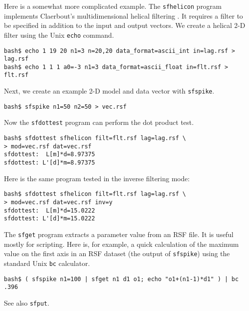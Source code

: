 Here is a somewhat more complicated example. The \texttt{sfhelicon}
program implements Claerbout's multidimensional helical filtering
\cite[]{GEO63-05-15321541}. It requires a filter to be specified in
addition to the input and output vectors. We create a helical 
2-D filter using the Unix \texttt{echo} command.
\begin{verbatim}
bash$ echo 1 19 20 n1=3 n=20,20 data_format=ascii_int in=lag.rsf > lag.rsf
bash$ echo 1 1 1 a0=-3 n1=3 data_format=ascii_float in=flt.rsf > flt.rsf
\end{verbatim}
Next, we create an example 2-D model and data vector with \texttt{sfspike}.
\begin{verbatim}
bash$ sfspike n1=50 n2=50 > vec.rsf
\end{verbatim}
Now the \texttt{sfdottest} program can perform the dot product test.
\begin{verbatim}
bash$ sfdottest sfhelicon filt=flt.rsf lag=lag.rsf \
> mod=vec.rsf dat=vec.rsf
sfdottest:  L[m]*d=8.97375
sfdottest: L'[d]*m=8.97375
\end{verbatim}
Here is the same program tested in the inverse filtering mode:
\begin{verbatim}
bash$ sfdottest sfhelicon filt=flt.rsf lag=lag.rsf \
> mod=vec.rsf dat=vec.rsf inv=y
sfdottest:  L[m]*d=15.0222
sfdottest: L'[d]*m=15.0222
\end{verbatim}

\noindent\doublebox{\parbox{\textwidth}{

}}

The \texttt{sfget} program extracts a parameter value from an RSF file. It is
useful mostly for scripting. Here is, for example, a quick calculation of the
maximum value on the first axis in an RSF dataset (the output of
\texttt{sfspike}) using the standard Unix \texttt{bc} calculator.
\begin{verbatim}
bash$ ( sfspike n1=100 | sfget n1 d1 o1; echo "o1+(n1-1)*d1" ) | bc
.396
\end{verbatim}
See also \texttt{sfput}.

\noindent\doublebox{\parbox{\textwidth}{

}}

